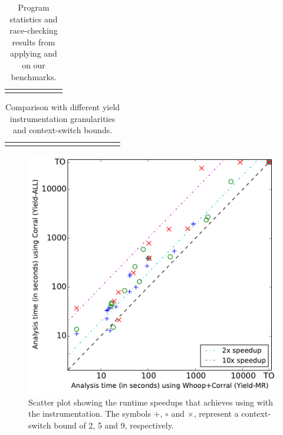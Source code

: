 \newcommand{\colspacing}{\hspace{1.8em}}
\begin{table}[t]
\small
\centering
\setlength{\tabcolsep}{0.3em}
\caption{Program statistics and race-checking results from applying \whoop and \corral on our benchmarks.}
\label{tab:stats}
\begin{tabular}{l rrr rr r}
\centering

\end{tabular}
\vspace{-3mm}
\end{table}

\begin{table}[t]
\small
\centering
\setlength{\tabcolsep}{0.4em}
\caption{Comparison with different yield instrumentation granularities and context-switch bounds.}
\label{tab:results}
\begin{tabular}{l r rrrr rrrr rrrr}
\centering

\end{tabular}
\vspace{-3mm}
\end{table}

\begin{figure}
\centering
\includegraphics[width=.99\linewidth]{experiments/figures/yieldmr_vs_yieldall.pdf}
\vspace{-2mm}
\caption{Scatter plot showing the runtime speedups that \corral achieves using \whoop with the \yieldmr instrumentation. The symbols $+$, $\circ$ and $\times$, represent a context-switch bound of 2, 5 and 9, respectively.}
\label{fig:plot}
\vspace{-2mm}
\end{figure}

